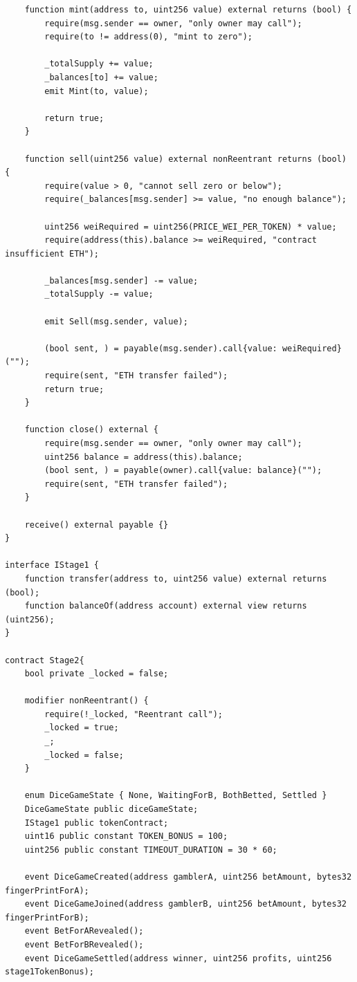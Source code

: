 \documentclass[10pt,a4paper]{article}
\begin{document}
\begin{lstlisting}
    function mint(address to, uint256 value) external returns (bool) {
        require(msg.sender == owner, "only owner may call");
        require(to != address(0), "mint to zero");

        _totalSupply += value;
        _balances[to] += value;
        emit Mint(to, value);

        return true;
    }

    function sell(uint256 value) external nonReentrant returns (bool) {
        require(value > 0, "cannot sell zero or below");
        require(_balances[msg.sender] >= value, "no enough balance");

        uint256 weiRequired = uint256(PRICE_WEI_PER_TOKEN) * value;
        require(address(this).balance >= weiRequired, "contract insufficient ETH");

        _balances[msg.sender] -= value;
        _totalSupply -= value;

        emit Sell(msg.sender, value);

        (bool sent, ) = payable(msg.sender).call{value: weiRequired}("");
        require(sent, "ETH transfer failed");
        return true;
    }

    function close() external {
        require(msg.sender == owner, "only owner may call");
        uint256 balance = address(this).balance;
        (bool sent, ) = payable(owner).call{value: balance}("");
        require(sent, "ETH transfer failed");
    }

    receive() external payable {}
}

interface IStage1 {
    function transfer(address to, uint256 value) external returns (bool);
    function balanceOf(address account) external view returns (uint256);
}

contract Stage2{
    bool private _locked = false;
    
    modifier nonReentrant() {
        require(!_locked, "Reentrant call");
        _locked = true;
        _;
        _locked = false;
    }
    
    enum DiceGameState { None, WaitingForB, BothBetted, Settled }
    DiceGameState public diceGameState;
    IStage1 public tokenContract;
    uint16 public constant TOKEN_BONUS = 100; 
    uint256 public constant TIMEOUT_DURATION = 30 * 60;

    event DiceGameCreated(address gamblerA, uint256 betAmount, bytes32 fingerPrintForA);
    event DiceGameJoined(address gamblerB, uint256 betAmount, bytes32 fingerPrintForB);
    event BetForARevealed();
    event BetForBRevealed();
    event DiceGameSettled(address winner, uint256 profits, uint256 stage1TokenBonus);


\end{lstlisting}
\end{document}
